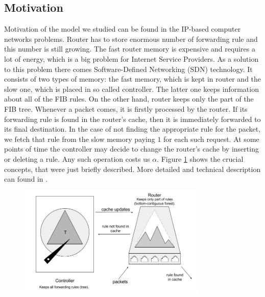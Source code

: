 \subsection{Motivation}
Motivation of the model we studied can be found in the IP-based computer networks 
problems. Router has to store enormous number of forwarding rule and this number is 
still growing. The fast router memory is expensive and requires a lot of energy, 
which is a big problem for Internet Service Providers. As a solution to this 
problem there comes Software-Defined Networking (SDN) technology. It consists of two 
types of memory: the fast memory, which is kept in router and the slow one, which is 
placed in so called controller. The latter one keeps information about all of the FIB rules. 
On the other hand, router keeps only the part of the FIB tree. Whenever a packet comes, it is firstly 
processed by the router. If its forwarding rule is found in the router's cache, then it 
is immediately forwarded to its final destination. In the case of not finding the appropriate
rule for the packet, we fetch that rule from the slow memory paying $1$ for each such request. At some points of 
time the controller may decide to change the router's cache by inserting or deleting 
a rule. Any such operation costs us $\alpha$. Figure \ref{fig:motivation} shows 
the crucial concepts, that were just briefly described. More detailed and 
technical description can found in \cite{sdn}.
 \begin{figure}
 \begin{center}
  \includegraphics[width=0.8\textwidth]{motivation.png}
\end{center}
\caption{}
\label{fig:motivation}
\end{figure}

